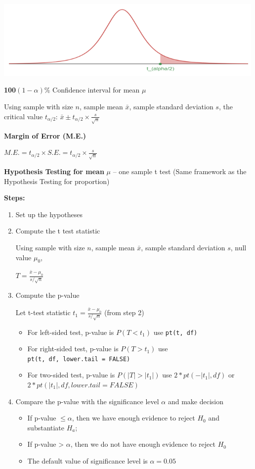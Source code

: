 \documentclass[
]{book}
\begin{document}
\includegraphics[width=5.20833in,height=\textheight]{images/img54.png}

\textbf{100}\((1-\alpha)\%\) Confidence interval for mean \(\mu\)

Using sample with size \(n\), sample mean \(\bar{x}\), sample standard deviation \(s\), the critical value \(t_{\alpha/2}\): \(\bar{x} \pm t_{\alpha/2} \times \frac{s}{\sqrt{n}}\)

\textbf{Margin of Error (M.E.)}

\(M.E. = t_{\alpha/2} \times S.E. = t_{\alpha/2} \times \frac{s}{\sqrt{n}}\)

\textbf{Hypothesis Testing for mean} \(\mu\) -- one sample t test (Same framework as the Hypothesis Testing for proportion)

\textbf{Steps:}

\begin{enumerate}
\def\labelenumi{\arabic{enumi}.}
\item
  Set up the hypotheses
\item
  Compute the t test statistic

  Using sample with size \(n\), sample mean \(\bar{x}\), sample standard deviation \(s\), null value \(\mu_0\),

  \(T = \frac{\bar{x} - \mu_0}{s/\sqrt{n}}\)
\item
  Compute the p-value

  Let t-test statistic \(t_1 = \frac{\bar{x} - \mu_0}{s/\sqrt{n}}\) (from step 2)

  \begin{itemize}
  \item
    For left-sided test, p-value is \(P(T < t_1)\) use \texttt{pt(t,\ df)}
  \item
    For right-sided test, p-value is \(P(T > t_1)\) use \texttt{pt(t,\ df,\ lower.tail\ =\ FALSE)}
  \item
    For two-sided test, p-value is \(P(|T| > |t_1|)\) use \(2*pt(-|t_1|, df)\) or \(2*pt(|t_1|, df, lower.tail = FALSE)\)
  \end{itemize}
\item
  Compare the p-value with the significance level \(\alpha\) and make decision

  \begin{itemize}
  \item
    If p-value \(\leq \alpha\), then we have enough evidence to reject \(H_0\) and substantiate \(H_a\);
  \item
    If p-value \textgreater{} \(\alpha\), then we do not have enough evidence to reject \(H_0\)
  \item
    The default value of significance level is \(\alpha = 0.05\)
  \end{itemize}
\end{enumerate}
\end{document}
